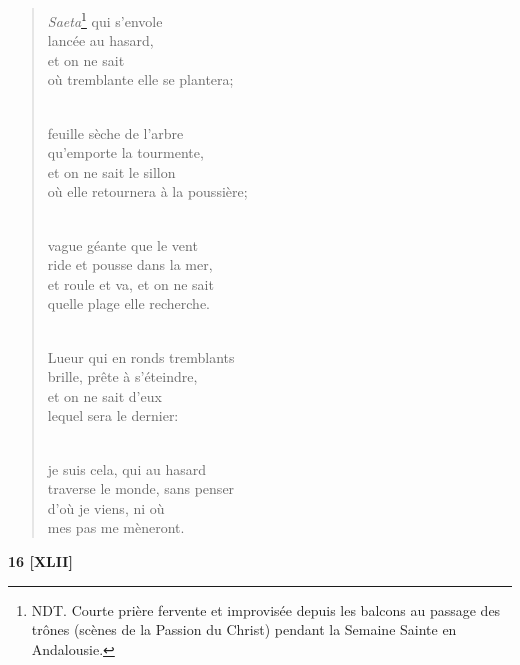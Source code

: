 \documentclass[a4paper,11pt]{book}
\begin{document}
\begin{verse}
{\em Saeta}\footnote{NDT. Courte prière fervente et improvisée depuis les balcons au passage des trônes (scènes de la Passion du Christ) pendant la Semaine Sainte en Andalousie.} qui s'envole \\
lancée au hasard, \\
et on ne sait \\
où tremblante elle se plantera; \\ \

feuille sèche de l'arbre \\
qu'emporte la tourmente, \\
et on ne sait le sillon \\
où elle retournera à la poussière; \\ \

vague géante que le vent \\
ride et pousse dans la mer, \\
et roule et va, et on ne sait \\
quelle plage elle recherche. \\ \


Lueur qui en ronds tremblants \\
brille, prête à s'éteindre, \\
et on ne sait d'eux \\
lequel sera le dernier: \\ \

je suis cela, qui au hasard \\
traverse le monde, sans penser \\
d'où je viens, ni où \\
mes pas me mèneront. \\
\end{verse}

\bigskip

\begin{center} {\bf 16 [XLII]} \end{center}
\end{document}
